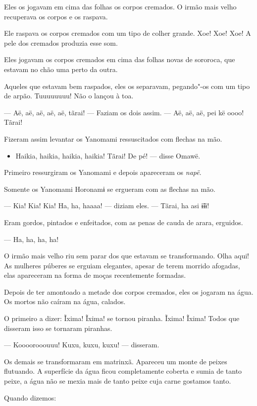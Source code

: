 Eles os jogavam em cima das folhas os corpos cremados. O irmão mais
velho recuperava os corpos e os raspava. 

Ele raspava os corpos cremados com um tipo de colher grande. Xoe! Xoe!
Xoe! A pele dos cremados produzia esse som. 

Eles jogavam os corpos cremados em cima das folhas novas de sororoca,
que estavam no chão uma perto da outra. 

Aqueles que estavam bem raspados, eles os separavam, pegando"-os com um
tipo de arpão. Tuuuuuuuu! Não o lançou à toa. 

--- Aë, aë, aë, aë, aë, tãrai! --- Faziam os dois assim. --- Aë, aë, aë,
pei kë oooo! Tãrai! 

Fizeram assim levantar os Yanomami ressuscitados com flechas na mão. 

\begin{itemize}
\itemsep1pt\parskip0pt
\item
  Haikia, haikia, haikia, haikia! Tãrai! De pé! --- disse Omawë.
\end{itemize}

Primeiro ressurgiram os Yanomami e depois apareceram os \emph{napë}. 

Somente os Yanomami Horonamɨ se ergueram com as flechas na mão. 

--- Kia! Kia! Kia! Ha, ha, haaaa! --- diziam eles. --- Tãrai, ha asi
ɨ̃ɨɨ! 

Eram gordos, pintados e enfeitados, com as penas de cauda de arara,
erguidos.

--- Ha, ha, ha, ha! 

O irmão mais velho riu sem parar dos que estavam se transformando. Olha
aqui! As mulheres púberes se erguiam elegantes, apesar de terem morrido
afogadas, elas apareceram na forma de moças recentemente formadas. 

Depois de ter amontoado a metade dos corpos cremados, eles os jogaram na
água. Os mortos não caíram na água, calados. 

O primeiro a dizer: Ĩxima! Ĩxima! se tornou piranha. Ĩxima! Ĩxima! Todos
que disseram isso se tornaram piranhas. 

--- Koooorooouuu! Kuxu, kuxu, kuxu! --- disseram. 

Os demais se transformaram em matrinxã. Apareceu um monte de peixes
flutuando. A superfície da água ficou completamente coberta e sumia de
tanto peixe, a água não se mexia mais de tanto peixe cuja carne gostamos
tanto.

Quando dizemos:

